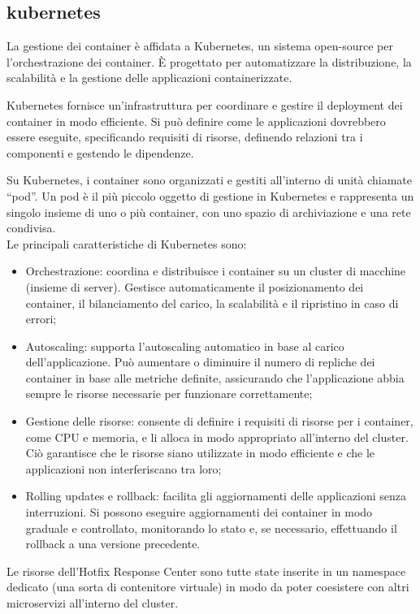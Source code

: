 \subsection{kubernetes}
La gestione dei container è affidata a Kubernetes, un sistema open-source per 
l'orchestrazione dei container. È progettato per automatizzare la distribuzione, 
la scalabilità e la gestione delle applicazioni containerizzate.

Kubernetes fornisce un'infrastruttura per coordinare e gestire il deployment 
dei container in modo efficiente. Si può definire come le applicazioni dovrebbero 
essere eseguite, specificando requisiti di risorse, definendo relazioni tra i 
componenti e gestendo le dipendenze.

Su Kubernetes, i container sono organizzati e gestiti all'interno di unità 
chiamate “pod”. Un pod è il più piccolo oggetto di gestione in Kubernetes e 
rappresenta un singolo insieme di uno o più container, con uno spazio di 
archiviazione e una rete condivisa.\\

Le principali caratteristiche di  Kubernetes sono:
\begin{itemize}
\item Orchestrazione: coordina e distribuisce i container su un cluster di macchine (insieme di server). Gestisce automaticamente il posizionamento dei container, il bilanciamento del carico, la scalabilità e il ripristino in caso di errori;
\item Autoscaling: supporta l'autoscaling automatico in base al carico dell'applicazione. Può aumentare o diminuire il numero di repliche dei container in base alle metriche definite, assicurando che l'applicazione abbia sempre le risorse necessarie per funzionare correttamente;
\item Gestione delle risorse: consente di definire i requisiti di risorse per i container, come CPU e memoria, e li alloca in modo appropriato all'interno del cluster. Ciò garantisce che le risorse siano utilizzate in modo efficiente e che le applicazioni non interferiscano tra loro;
\item Rolling updates e rollback: facilita gli aggiornamenti delle applicazioni senza interruzioni. Si possono eseguire aggiornamenti dei container in modo graduale e controllato, monitorando lo stato e, se necessario, effettuando il rollback a una versione precedente.
\end{itemize}

Le risorse dell’Hotfix Response Center sono tutte state inserite in un namespace 
dedicato (una sorta di contenitore virtuale) in modo da poter coesistere con 
altri microservizi all'interno del cluster.\\

